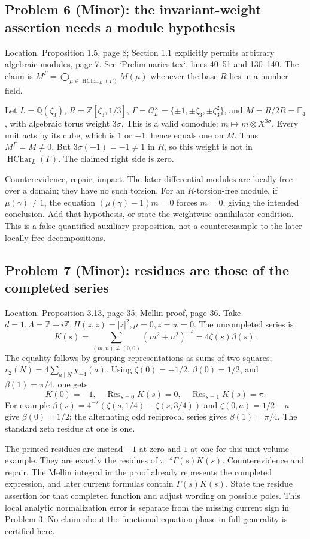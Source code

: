 \documentclass[10pt]{article}
\begin{document}
\subsection*{Problem 6 (Minor): the invariant-weight assertion needs a module hypothesis}
Location. Proposition 1.5, page 8; Section 1.1 explicitly permits arbitrary algebraic modules, page 7. See `Preliminaries.tex`, lines 40–51 and 130–140. The claim is \(M^\Gamma=\bigoplus_{\mu\in\operatorname{HChar}_L(\Gamma)}
M(\mu)\) whenever the base \(R\) lies in a number field.\par
Let \(L=\mathbb Q(\zeta_3)\), \(R=\mathbb Z[\zeta_3,1/3]\), \(\Gamma=\mathcal O_L^\times=\{\pm1,\pm\zeta_3,\pm\zeta_3^2\}\), and \(M=R/2R=\mathbb F_4\), with algebraic torus weight \(3\sigma\). This is a valid comodule: \(m\mapsto m\otimes X^{3\sigma}\). Every unit acts by its cube, which is \(1\) or \(-1\), hence equals one on \(M\). Thus \(M^\Gamma=M\neq0\). But \(3\sigma(-1)=-1\neq1\) in \(R\), so this weight is not in \(\operatorname{HChar}_L(\Gamma)\). The claimed right side is zero.\par
Counterevidence, repair, impact. The later differential modules are locally free over a domain; they have no such torsion. For an \(R\)-torsion-free module, if \(\mu(\gamma)\neq1\), the equation \((\mu(\gamma)-1)m=0\) forces \(m=0\), giving the intended conclusion. Add that hypothesis, or state the weightwise annihilator condition. This is a false quantified auxiliary proposition, not a counterexample to the later locally free decompositions.\par
\subsection*{Problem 7 (Minor): residues are those of the completed series}
Location. Proposition 3.13, page 35; Mellin proof, page 36. Take \(d=1,\Lambda=\mathbb Z+i\mathbb Z,H(z,z)=|z|^2,\mu=0,z=w=0\). The uncompleted series is \[K(s)=\sum_{(m,n)\neq(0,0)}(m^2+n^2)^{-s}=4\zeta(s)\beta(s).\] The equality follows by grouping representations as sums of two squares; \(r_2(N)=4\sum_{a\mid N}\chi_{-4}(a)\). Using \(\zeta(0)=-1/2\), \(\beta(0)=1/2\), and \(\beta(1)=\pi/4\), one gets \[K(0)=-1,\quad \operatorname{Res}_{s=0}K(s)=0,\quad \operatorname{Res}_{s=1}K(s)=\pi.\] For example \(\beta(s)=4^{-s}(\zeta(s,1/4)-\zeta(s,3/4))\) and \(\zeta(0,a)=1/2-a\) give \(\beta(0)=1/2\); the alternating odd reciprocal series gives \(\beta(1)=\pi/4\). The standard zeta residue at one is one.\par
The printed residues are instead \(-1\) at zero and \(1\) at one for this unit-volume example. They are exactly the residues of \(\pi^{-s}\Gamma(s)K(s)\). Counterevidence and repair. The Mellin integral in the proof already represents the completed expression, and later current formulas contain \(\Gamma(s)K(s)\). State the residue assertion for that completed function and adjust wording on possible poles. This local analytic normalization error is separate from the missing current sign in Problem 3. No claim about the functional-equation phase in full generality is certified here.\par
\end{document}
